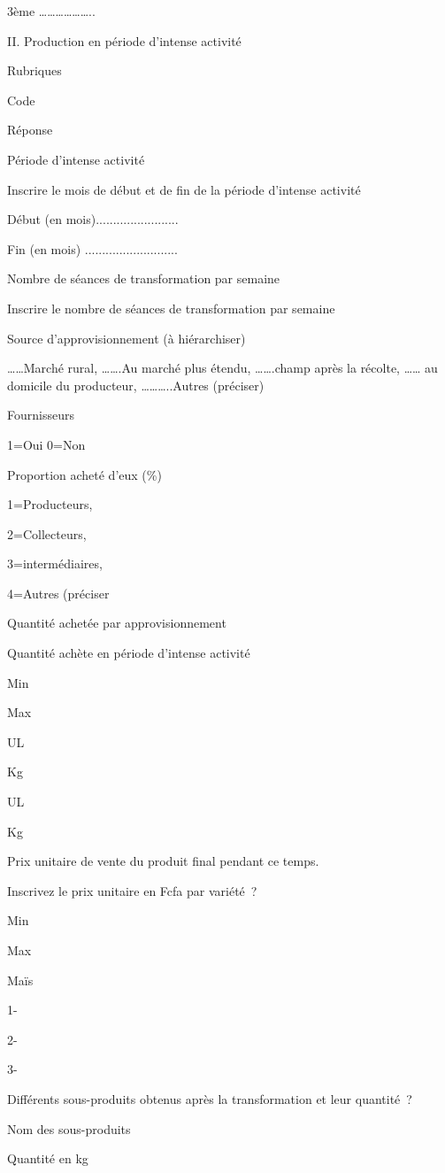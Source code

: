 \documentclass[12pt,oneside]{report}
\begin{document}
3ème ………………..

II. Production en période d’intense activité

Rubriques

Code

Réponse

Période d’intense activité

Inscrire le mois de début et de fin de la période d’intense activité

Début (en mois)........................

Fin (en mois) ...........................

Nombre de séances de transformation par semaine

Inscrire le nombre de séances de transformation par semaine

Source d’approvisionnement (à hiérarchiser)

……Marché rural, …….Au marché plus étendu, …….champ après la récolte, …… au domicile du producteur, ………..Autres (préciser)

Fournisseurs

1=Oui 0=Non

Proportion  acheté d’eux (\%)

1=Producteurs,

2=Collecteurs,

3=intermédiaires,

4=Autres (préciser

Quantité achetée par approvisionnement

Quantité achète en période d’intense activité

Min

Max

UL

Kg

UL

Kg

Prix unitaire de vente du produit final pendant ce temps.

Inscrivez le prix unitaire en Fcfa par variété ?

Min

Max

Maïs

1-

2-

3-

Différents sous-produits obtenus après la transformation et leur quantité ?

Nom des sous-produits

Quantité en kg
\end{document}
